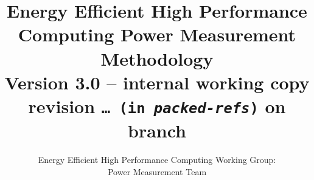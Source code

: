 \documentclass[parskip]{scrreprt}
\author{Energy Efficient High Performance Computing Working Group:\\Power Measurement Team}
\newcommand{\commit}{\dots~(in \emph{packed-refs})}}
\begin{document}
\graphicspath{{figures/}}

\pagestyle{headings}  %

\title{
Energy Efficient High Performance Computing Power Measurement Methodology \\
\bigskip
\normalsize{Version 3.0 -- internal working copy}\\
\bigskip
\scriptsize{revision \texttt{\commit} on branch \texttt{\branch}}
}


\date{ }
\maketitle              %

\tableofcontents
\listoftables
\listoffigures

\newcommand{\SpecAccuracyLThree}{\SI{1}{\percent}}
\newcommand{\SpecAccuracyLTwo}{\SI{2}{\percent}}
\newcommand{\SpecAccuracyLOne}{\SI{5}{\percent}}
\newcommand{\SpecAccuracyMeter}{\SI{3}{\percent}}
\newcommand{\SpecPowerMinLOne}{\SI{2}{\kilo\watt}}
\newcommand{\SpecPowerMinLTwo}{\SI{10}{\kilo\watt}}
\newcommand{\SpecPowerMaxLOne}{\SI{40}{\kilo\watt}}
\newcommand{\SpecFracMinLOne}{\num[parse-numbers=false]{\frac{1}{10}}}
\newcommand{\SpecFracMinLTwo}{\num[parse-numbers=false]{\frac{1}{8}}}
\newcommand{\SpecMinNodes}{\num{15}}
\newcommand{\MinMeasurementsCorePhaseLTwoThree}{\num{10}}

%



\newpage





% 

\end{document}

